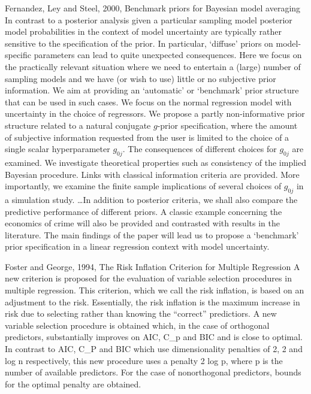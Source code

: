 \documentclass{amsart}[12pt]
\begin{document}
Fernandez, Ley and Steel, 2000, Benchmark priors for Bayesian model averaging
In contrast to a posterior analysis given a particular sampling model posterior model probabilities in the
context of model uncertainty are typically rather sensitive to the specification of the prior. In particular,
`diffuse' priors on model-specific parameters can lead to quite unexpected consequences. Here we focus on the
practically relevant situation where we need to entertain a (large) number of sampling models and we have (or wish to use) little or no subjective prior information. We aim at providing an `automatic' or `benchmark'
prior structure that can be used in such cases. We focus on the normal regression model with uncertainty in
the choice of regressors. We propose a partly non-informative prior structure related to a natural conjugate
$g$-prior specification, where the amount of subjective information requested from the user is limited to the
choice of a single scalar hyperparameter $g_{0j}$. The consequences of different choices for $g_{0j}$ are
examined. We investigate theoretical properties such as consistency of the implied Bayesian procedure. Links
with classical information criteria are provided. More importantly, we examine the finite sample implications
of several choices of $g_{0j}$ in a simulation study. \ldots In addition to posterior criteria, we shall also
compare the predictive performance of different priors. A classic example concerning the economics of crime
will also be provided and contrasted with results in the literature. The main findings of the paper will lead
us to propose a `benchmark' prior specification in a linear regression context with model uncertainty.

Foster and George, 1994, The Risk Inflation Criterion for Multiple Regression
A new criterion is proposed for the evaluation of variable selection procedures in multiple regression. This
criterion, which we call the risk inflation, is based on an adjustment to the risk. Essentially, the risk
inflation is the maximum increase in risk due to selecting rather than knowing the ``correct'' predictiors.
A new variable selection procedure is obtained which, in the case of orthogonal predictors, substantially
improves on AIC, C_p and BIC and is close to optimal. In contrast to AIC, C_P and BIC which use dimensionality
penalties of 2, 2 and log n respectively, this new procedure uses a penalty 2 log p, where p is the number of
available predictors. For the case of nonorthogonal predictors, bounds for the optimal penalty are obtained.
\end{document}
